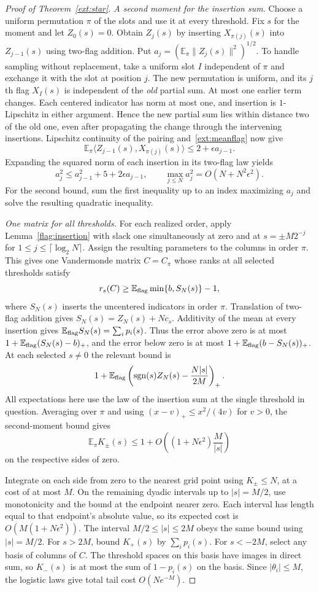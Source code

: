 \begin{proof}[Proof of Theorem~\ref{ext:star}]
\emph{A second moment for the insertion sum.}
Choose a uniform permutation $\pi$ of the slots and use it at every
threshold. Fix $s$ for the moment and let $Z_0(s)=0$. Obtain $Z_j(s)$
by inserting $X_{\pi(j)}(s)$ into $Z_{j-1}(s)$ using two-flag
addition. Put $a_j=(\mathbb E_\pi\|Z_j(s)\|^2)^{1/2}$. To handle
sampling without replacement, take a uniform slot $I$ independent of
$\pi$ and exchange it with the slot at position $j$. The new permutation
is uniform, and its $j$th flag $X_I(s)$ is independent of the
\emph{old} partial sum. At most one earlier term changes. Each centered
indicator has norm at most one, and insertion is $1$-Lipschitz in
either argument. Hence the new partial sum lies within distance two of
the old one, even after propagating the change through the intervening
insertions. Lipschitz continuity of the pairing and~\eqref{ext:meanflag}
now give
\[
 \mathbb E_\pi\langle Z_{j-1}(s),X_{\pi(j)}(s)\rangle
    \le 2+\epsilon a_{j-1}.
\]
Expanding the squared norm of each insertion in its two-flag law yields
\[
 a_j^2\le a_{j-1}^2+5+2\epsilon a_{j-1},
 \qquad
 \max_{j\le N} a_j^2=O(N+N^2\epsilon^2).
\]
For the second bound, sum the first inequality up to an index
maximizing $a_j$ and solve the resulting quadratic inequality.

\emph{One matrix for all thresholds.}
For each realized order, apply Lemma~\ref{flag:insertion} with slack one
simultaneously at zero and at $s=\pm M2^{-j}$ for
$1\le j\le\lceil\log_2 N\rceil$. Assign the resulting parameters to
the columns in order $\pi$. This gives one Vandermonde matrix $C=C_\pi$
whose ranks at all selected thresholds satisfy
\[
 r_s(C)\ge\mathbb E_{\rm flag}\min\{b,S_N(s)\}-1 ,
\]
where $S_N(s)$ inserts the uncentered indicators in order $\pi$.
Translation of two-flag addition gives $S_N(s)=Z_N(s)+Nc_s$.
Additivity of the mean at every insertion gives
$\mathbb E_{\rm flag}S_N(s)=\sum_i p_i(s)$. Thus the error above
zero is at most $1+\mathbb E_{\rm flag}(S_N(s)-b)_+$, and the error
below zero is at most $1+\mathbb E_{\rm flag}(b-S_N(s))_+$. At
each selected $s\ne0$ the relevant bound is
\[
 1+\mathbb E_{\rm flag}
   \left(\operatorname{sgn}(s)Z_N(s)-\frac{N|s|}{2M}\right)_+ .
\]
All expectations here use the law of the insertion sum at the single
threshold in question. Averaging over $\pi$ and using
$(x-v)_+\le x^2/(4v)$ for $v>0$, the second-moment bound gives
\[
 \mathbb E_\pi K_\pm(s)\le 1+O\!\left((1+N\epsilon^2)\frac{M}{|s|}\right)
\]
on the respective sides of zero.

Integrate on each side from zero to the nearest grid point using
$K_\pm\le N$, at a cost of at most $M$. On the remaining dyadic
intervals up to $|s|=M/2$, use monotonicity and the bound at the
endpoint nearer zero. Each interval has length equal to that
endpoint's absolute value, so its expected cost is
$O(M(1+N\epsilon^2))$. The interval $M/2\le|s|\le2M$ obeys the
same bound using $|s|=M/2$. For $s>2M$, bound $K_+(s)$ by
$\sum_i p_i(s)$. For $s<-2M$, select any basis of columns of $C$.
The threshold spaces on this basis have images in direct sum, so
$K_-(s)$ is at most the sum of $1-p_i(s)$ on the basis. Since
$|\theta_i|\le M$, the logistic laws give total tail cost $O(Ne^{-M})$.


\end{proof}
